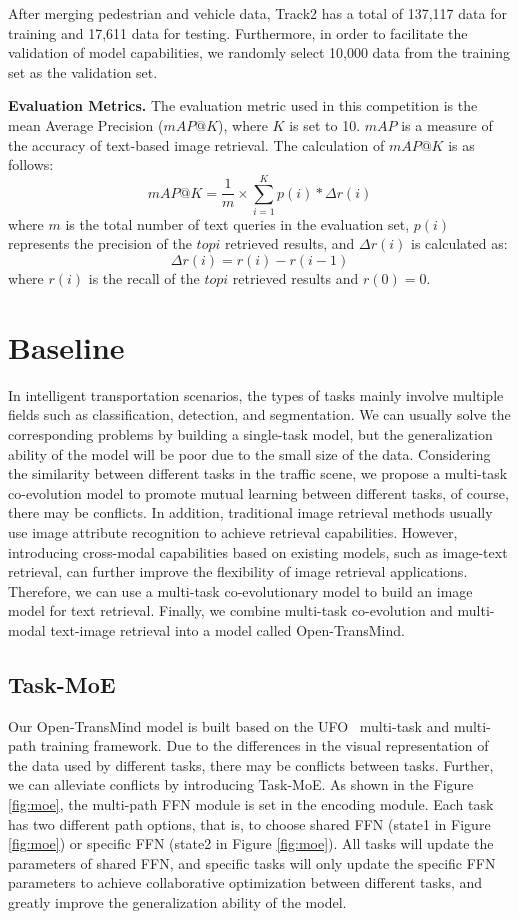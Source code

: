 \documentclass[10pt,twocolumn,letterpaper]{article}
\begin{document}
After merging pedestrian and vehicle data, Track2 has a total of 137,117 data for training and 17,611 data for testing. Furthermore, in order to facilitate the validation of model capabilities, we randomly select 10,000 data from the training set as the validation set.


\textbf{Evaluation Metrics.}
The evaluation metric used in this competition is the mean Average Precision ($mAP@K$), where $K$ is set to 10. $mAP$ is a measure of the accuracy of text-based image retrieval. The calculation of $mAP@K$ is as follows:
$$mAP@K=\frac{1}{m} \times \sum_{i=1}^{K}{p(i)*\Delta r(i)}$$
where $m$ is the total number of text queries in the evaluation set, $p(i)$ represents the precision of the $topi$ retrieved results, and $\Delta r(i)$ is calculated as:
$$\Delta r(i)=r(i)-r(i-1)$$
where $r(i)$ is the recall of the $topi$ retrieved results and $r(0)=0$.



\section{Baseline}
In intelligent transportation scenarios, the types of tasks mainly involve multiple fields such as classification, detection, and segmentation. We can usually solve the corresponding problems by building a single-task model, but the generalization ability of the model will be poor due to the small size of the data. Considering the similarity between different tasks in the traffic scene, we propose a multi-task co-evolution model to promote mutual learning between different tasks, of course, there may be conflicts. In addition, traditional image retrieval methods usually use image attribute recognition to achieve retrieval capabilities. However, introducing cross-modal capabilities based on existing models, such as image-text retrieval, can further improve the flexibility of image retrieval applications. Therefore, we can use a multi-task co-evolutionary model to build an image model for text retrieval. Finally, we combine multi-task co-evolution and multi-modal text-image retrieval into a model called Open-TransMind.

\subsection{Task-MoE}
Our Open-TransMind model is built based on the UFO~\cite{xi2022ufo} multi-task and multi-path training framework. Due to the differences in the visual representation of the data used by different tasks, there may be conflicts between tasks. Further, we can alleviate conflicts by introducing Task-MoE. As shown in the Figure \ref{fig:moe}, the multi-path FFN module is set in the encoding module. Each task has two different path options, that is, to choose shared FFN (state1 in Figure \ref{fig:moe}) or specific FFN (state2 in Figure \ref{fig:moe}). All tasks will update the parameters of shared FFN, and specific tasks will only update the specific FFN parameters to achieve collaborative optimization between different tasks, and greatly improve the generalization ability of the model.
\end{document}
